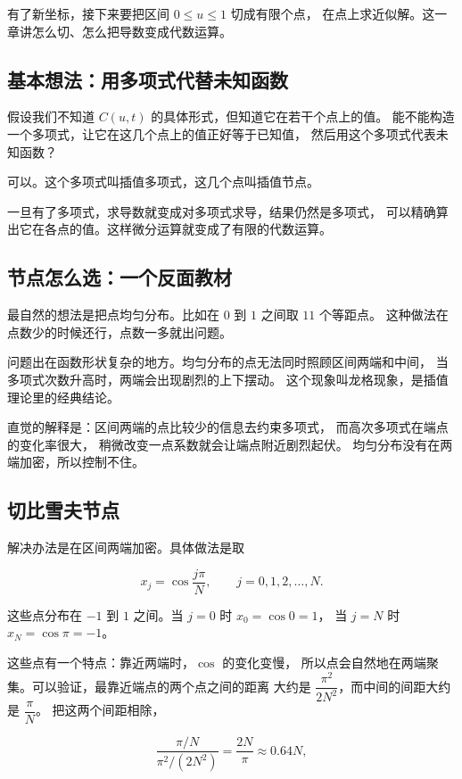 有了新坐标，接下来要把区间 $0\le u\le1$ 切成有限个点，
在点上求近似解。这一章讲怎么切、怎么把导数变成代数运算。

\subsection{基本想法：用多项式代替未知函数}

假设我们不知道 $C(u,t)$ 的具体形式，但知道它在若干个点上的值。
能不能构造一个多项式，让它在这几个点上的值正好等于已知值，
然后用这个多项式代表未知函数？

可以。这个多项式叫插值多项式，这几个点叫插值节点。

一旦有了多项式，求导数就变成对多项式求导，结果仍然是多项式，
可以精确算出它在各点的值。这样微分运算就变成了有限的代数运算。

\subsection{节点怎么选：一个反面教材}

最自然的想法是把点均匀分布。比如在 $0$ 到 $1$ 之间取 $11$ 个等距点。
这种做法在点数少的时候还行，点数一多就出问题。

问题出在函数形状复杂的地方。均匀分布的点无法同时照顾区间两端和中间，
当多项式次数升高时，两端会出现剧烈的上下摆动。
这个现象叫龙格现象，是插值理论里的经典结论。

直觉的解释是：区间两端的点比较少的信息去约束多项式，
而高次多项式在端点的变化率很大，
稍微改变一点系数就会让端点附近剧烈起伏。
均匀分布没有在两端加密，所以控制不住。

\subsection{切比雪夫节点}

解决办法是在区间两端加密。具体做法是取

\begin{equation}
x_j = \cos\frac{j\pi}{N}, \qquad j=0,1,2,\dots,N .
\label{eq:chebnode}
\end{equation}

这些点分布在 $-1$ 到 $1$ 之间。当 $j=0$ 时 $x_0=\cos0=1$，
当 $j=N$ 时 $x_N=\cos\pi=-1$。

这些点有一个特点：靠近两端时，$\cos$ 的变化变慢，
所以点会自然地在两端聚集。可以验证，最靠近端点的两个点之间的距离
大约是 $\dfrac{\pi^2}{2N^2}$，而中间的间距大约是 $\dfrac{\pi}{N}$。
把这两个间距相除，

\begin{equation}
\frac{\pi/N}{\pi^2/(2N^2)} = \frac{2N}{\pi} \approx 0.64N ,
\end{equation}

